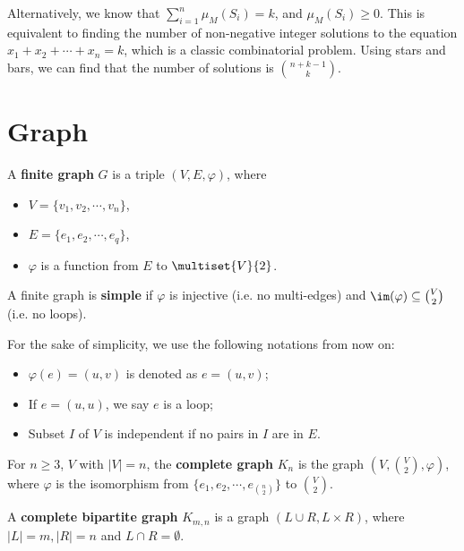 Alternatively, we know that $\sum_{i=1}^n \mu_M(S_i) = k$, and $\mu_M(S_i) \ge 0$. This is equivalent to finding the number of non-negative integer solutions to the equation $x_1 + x_2 + \cdots + x_n = k$, which is a classic combinatorial problem. Using stars and bars, we can find that the number of solutions is $\binom{n+k-1}{k}$.

\section{Graph}

\begin{definition}
	A \textbf{finite graph} $G$ is a triple $(V,E,\varphi)$, where
	\begin{itemize}
		\item $V = \{v_1,v_2,\cdots,v_n\}$,
		\item $E = \{e_1,e_2,\cdots,e_q\}$,
		\item $\varphi$ is a function from $E$ to $\multiset{V}{2}$.
	\end{itemize}
\end{definition}

\begin{definition}
	A finite graph is \textbf{simple} if $\varphi$ is injective (i.e. no multi-edges) and $\im(\varphi) \subseteq \binom{V}{2}$ (i.e. no loops).
\end{definition}

For the sake of simplicity, we use the following notations from now on:
\begin{itemize}
	\item $\varphi(e) = (u,v)$ is denoted as $e = (u,v)$;
	\item If $e=(u,u)$, we say $e$ is a loop;
	\item Subset $I$ of $V$ is independent if no pairs in $I$ are in $E$.
\end{itemize}

\begin{definition}
	For $n\ge 3$, $V$ with $|V|=n$, the \textbf{complete graph} $K_n$ is the graph $(V,\binom{V}{2},\varphi)$, where $\varphi$ is the isomorphism from $\{e_1,e_2,\cdots,e_{\binom{n}{2}}\}$ to $\binom{V}{2}$.

	A \textbf{complete bipartite graph} $K_{m,n}$ is a graph $(L\cup R, L\times R)$, where $|L|=m, |R|=n$ and $L\cap R = \emptyset$.
\end{definition}

